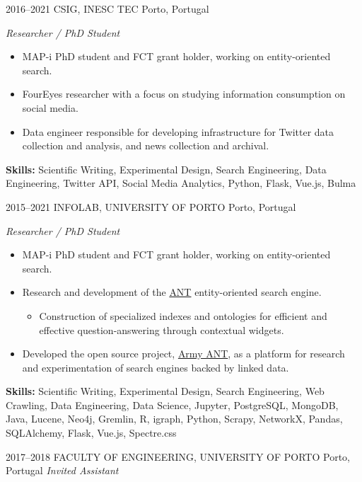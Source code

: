 \documentclass{friggeri-cv}
\begin{document}
\begin{entrylist}
\entry
{2016--2021}
{CSIG, INESC TEC}
{Porto, Portugal}
{\emph{Researcher / PhD Student}\\[-.5em]

\begin{itemize}[leftmargin=*]
  \item MAP-i PhD student and FCT grant holder, working on entity-oriented search.
  \item FourEyes researcher with a focus on studying information consumption on social media.
  \item Data engineer responsible for developing infrastructure for Twitter data collection and analysis, and news collection and archival.
\end{itemize}

\vspace{1em}

{\small \textbf{Skills:} Scientific Writing, Experimental Design, Search Engineering, Data Engineering, Twitter API, Social Media Analytics, Python, Flask, Vue.js, Bulma}\\}
\entry
{2015--2021}
{INFOLAB, UNIVERSITY OF PORTO}
{Porto, Portugal}
{\emph{Researcher / PhD Student}\\[-.5em]

\begin{itemize}[leftmargin=*]
  \item MAP-i PhD student and FCT grant holder, working on entity-oriented search.
  \item Research and development of the \href{https://ant.fe.up.pt/}{ANT} entity-oriented search engine.
  \begin{itemize}
    \small
    \item Construction of specialized indexes and ontologies for efficient and effective question-answering through contextual widgets.
  \end{itemize}
  \item Developed the open source project, \href{https://github.com/feup-infolab/army-ant}{Army ANT}, as a platform for research and experimentation of search engines backed by linked data.
\end{itemize}

\vspace{1em}

{\small \textbf{Skills:} Scientific Writing, Experimental Design, Search Engineering, Web Crawling, Data Engineering, Data Science, Jupyter, PostgreSQL, MongoDB, Java, Lucene, Neo4j, Gremlin, R, igraph, Python, Scrapy, \mbox{NetworkX}, Pandas, SQLAlchemy, Flask, Vue.js, Spectre.css}\\}
\entry
{2017--2018}
{FACULTY OF ENGINEERING, UNIVERSITY OF PORTO}
{Porto, Portugal}
{\emph{Invited Assistant}\\[-.5em]

}
\end{entrylist}
\end{document}
